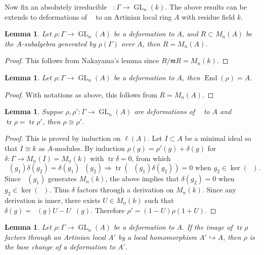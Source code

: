 \documentclass[leqno]{amsart}
\DeclareMathOperator{\GL}{GL}
\DeclareMathOperator{\mtr}{tr}
\newcommand{\1}{\mathbf{1}}
\newcommand{\fm}{\mathfrak m}
\DeclareMathOperator{\End}{End}
\DeclareMathOperator{\rrho}{\bar{\rho}}
\newtheorem{lem}[thm]{Lemma}
\theoremstyle{definition}
\theoremstyle{remark}
\begin{document}
Now fix an absolutely irreducible $\rrho\colon \Gamma\to \GL_n(k)$.
The above results can be extends to 
deformations of  $\rrho$ to an
Artinian local ring $A$ with residue field  $k$.
\begin{lem}
	Let $\rho\colon \Gamma\to \GL_n(A)$
	be a deformation to $A$,
	and $R\subset M_n(A)$ be the $A$-subalgebra
	generated by $\rho(\Gamma)$ over $A$,
	then  $R=M_n(A)$.
\end{lem}
\begin{proof}
	This follows from Nakayama's lemma
	since $R/\fm R=M_n(k)$.
\end{proof}
\begin{lem}
	Let $\rho\colon \Gamma\to \GL_n(A)$	
	be a deformation to $A$,
	then $\End(\rho)=A$.
\end{lem}
\begin{proof}
	With notations as above,
	this follows from $R=M_n(A)$.
\end{proof}
\begin{lem}
	Suppse $\rho,\rho'\colon \Gamma\to \GL_n(A)$
	are deformations of  $\rrho$ to  $A$
	and  $\mtr\rho=\mtr\rho'$,
	then  $\rho\cong \rho'$.
\end{lem}
\begin{proof}
	This is proved by induction on $\ell(A)$.
	Let  $I\subset A$ be a minimal ideal
	so that $I\cong k$ as  $A$-modules.
	By induction
	$\rho(g)=\rho'(g)+\delta(g)$
	for  $\delta\colon \Gamma\to M_n(I)=M_n(k)$
	with $\mtr\delta=0$,
	from which 
	\[
		 \rrho(g_1)\delta(g_2)=\delta(g_1)\rrho(g_2)
		 \Longrightarrow
		 \mtr(\rrho(g_1)\delta(g_2))=0
		 \text{ when }
		 g_2\in \ker(\rrho).
	\]
	Since $\rrho(g_1)$ generates  $M_n(k)$,
	the above implies that  $\delta(g_2)=0$
	when  $g_2\in\ker(\rrho)$.
	Thus $\delta$ factors through
	a derivation on $M_n(k)$.
	Since any derivation is inner, 
	there exists  $U\in M_n(k)$
	such that  $\delta(g)=\rrho(g)U-U\rrho(g)$.
	Therefore $\rho'=(1-U)\rho(1+U)$.
\end{proof}
\begin{lem}
	Let $\rho\colon \Gamma\to \GL_n(A)$
	be a deformation to $A$.
	If the image of $\mtr\rho$
	factors through an Artinian local $A'$
	by a local homomorphism $A'\hookrightarrow A$,
	then $\rho$
	is the base change of a deformation to  $A'$.
\end{lem}
\end{document}
